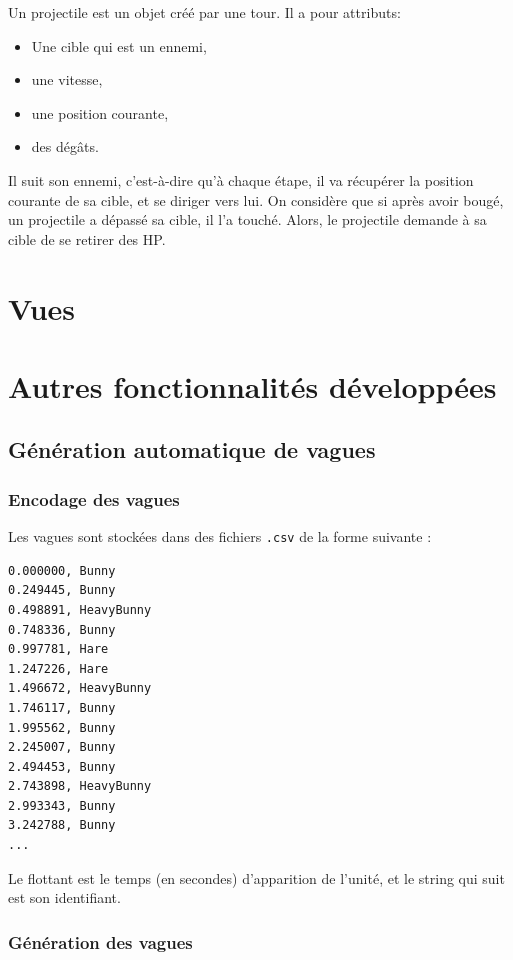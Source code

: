 \documentclass[a4paper,11pt]{article}
\begin{document}
Un projectile est un objet créé par une tour. Il a pour attributs:
\begin{itemize}
    \item Une cible qui est un ennemi,
    \item une vitesse,
    \item une position courante,
    \item des dégâts.
\end{itemize}

Il suit son ennemi, c'est-à-dire qu'à chaque étape, il va récupérer la position
courante de sa cible, et se diriger vers lui. On considère que si après avoir bougé,
un projectile a dépassé sa cible, il l'a touché. Alors, le projectile demande à
sa cible de se retirer des HP.

\section{Vues}


\section{Autres fonctionnalités développées}

\subsection{Génération automatique de vagues}

\subsubsection*{Encodage des vagues}

Les vagues sont stockées dans des fichiers \texttt{.csv} de la forme suivante :

\begin{verbatim}
0.000000, Bunny
0.249445, Bunny
0.498891, HeavyBunny
0.748336, Bunny
0.997781, Hare
1.247226, Hare
1.496672, HeavyBunny
1.746117, Bunny
1.995562, Bunny
2.245007, Bunny
2.494453, Bunny
2.743898, HeavyBunny
2.993343, Bunny
3.242788, Bunny
...
\end{verbatim}

Le flottant est le temps (en secondes) d'apparition de l'unité, et le string qui suit est son identifiant. \newline

\subsubsection*{Génération des vagues}
\end{document}
